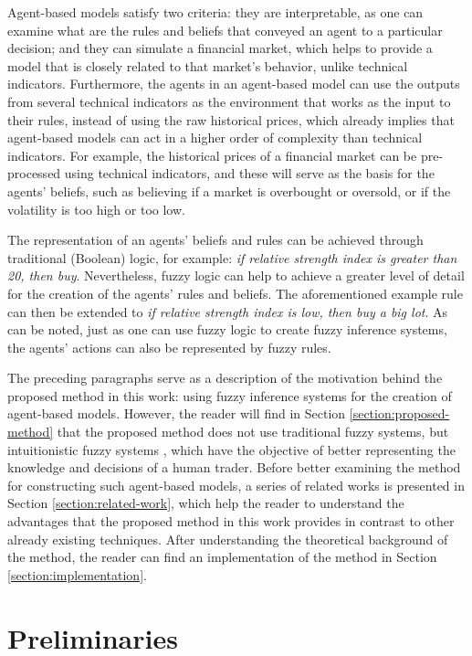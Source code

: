 \documentclass[10pt,letterpaper]{article}
\begin{document}
Agent-based models satisfy two criteria: they are interpretable, as one can examine what are the rules and beliefs that conveyed an agent to a particular decision; and they can simulate a financial market, which helps to provide a model that is closely related to that market's behavior, unlike technical indicators. Furthermore, the agents in an agent-based model can use the outputs from several technical indicators as the environment that works as the input to their rules, instead of using the raw historical prices, which already implies that agent-based models can act in a higher order of complexity than technical indicators. For example, the historical prices of a financial market can be pre-processed using technical indicators, and these will serve as the basis for the agents' beliefs, such as believing if a market is overbought or oversold, or if the volatility is too high or too low.

The representation of an agents' beliefs and rules can be achieved through traditional (Boolean) logic, for example: \textit{if relative strength index is greater than 20, then buy}. Nevertheless, fuzzy logic can help to achieve a greater level of detail for the creation of the agents' rules and beliefs. The aforementioned example rule can then be extended to \textit{if relative strength index is low, then buy a big lot}. As can be noted, just as one can use fuzzy logic to create fuzzy inference systems, the agents' actions can also be represented by fuzzy rules.

The preceding paragraphs serve as a description of the motivation behind the proposed method in this work: using fuzzy inference systems for the creation of agent-based models. However, the reader will find in Section \ref{section:proposed-method} that the proposed method does not use traditional fuzzy systems, but intuitionistic fuzzy systems \cite{Atanassov1986}, which have the objective of better representing the knowledge and decisions of a human trader. Before better examining the method for constructing such agent-based models, a series of related works is presented in Section \ref{section:related-work}, which help the reader to understand the advantages that the proposed method in this work provides in contrast to other already existing techniques. After understanding the theoretical background of the method, the reader can find an implementation of the method in Section \ref{section:implementation}.

\section*{Preliminaries}
\end{document}
